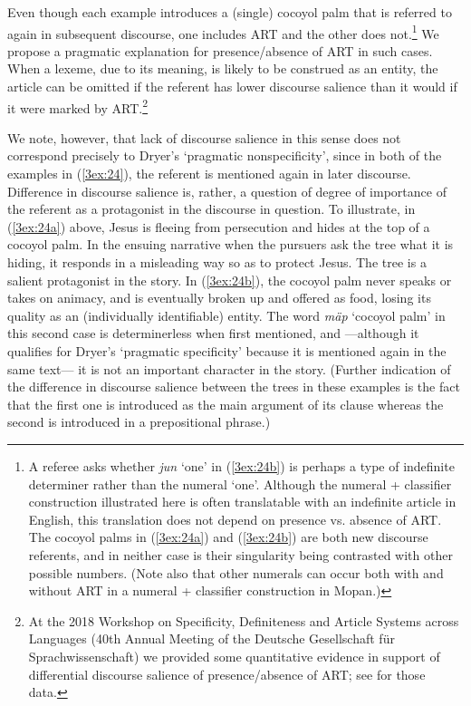 \documentclass[output=paper]{langsci/langscibook}
\begin{document}
Even though each example introduces a (single) cocoyol palm that is referred to again in subsequent discourse, one includes ART and the other does not.\footnote{{A referee asks whether {\emph{jun}} `one' in (\ref{3ex:24b}) is perhaps a type of indefinite determiner rather than the numeral `one'.  Although the numeral + classifier construction illustrated here is often translatable with an indefinite article in English, this translation does not depend on presence vs. absence of ART.  The cocoyol palms in (\ref{3ex:24a}) and (\ref{3ex:24b}) are both new discourse referents, and in neither case is their singularity being contrasted with other possible numbers.  (Note also that other numerals can occur both with and without ART in a numeral + classifier construction in Mopan.)}} We propose a pragmatic explanation for presence/absence of ART in such cases.  When a lexeme, due to its meaning, is likely to be construed as an entity, the article can be omitted if the referent has lower discourse salience than it would if it were marked by ART.\footnote{At the 2018 Workshop on Specificity, Definiteness and Article Systems across Languages (40th Annual Meeting of the Deutsche Gesellschaft f\"ur Sprachwissenschaft) we provided some quantitative evidence in support of differential discourse salience of presence/absence of ART; see \cite{contini:morava:danziger:fc} for those data.}

We note, however, that lack of discourse salience in this sense does not correspond precisely to Dryer's `pragmatic nonspecificity', since in both of the examples in (\ref{3ex:24}), the referent is mentioned again in later discourse. Difference in discourse salience is, rather, a question of degree of importance of the referent as a protagonist in the discourse in question.  To illustrate, in (\ref{3ex:24a}) above, Jesus is fleeing from persecution and hides at the top of a cocoyol palm.  In the ensuing narrative when the pursuers ask the tree what it is hiding, it responds in a misleading way so as to protect Jesus. The tree is a salient protagonist in the story.  In (\ref{3ex:24b}), the cocoyol palm never speaks or takes on animacy, and is eventually broken up and offered as food, losing its quality as an (individually identifiable) entity.  The word {\emph{m\"ap}} `cocoyol palm' in this second case is determinerless when first mentioned, and ---although it qualifies for Dryer's `pragmatic specificity' because it is mentioned again in the same text--- it is not an important character in the story.  (Further indication of the difference in discourse salience between the trees in these examples is the fact that the first one is introduced as the main argument of its clause whereas the second is introduced in a prepositional phrase.)
\end{document}
